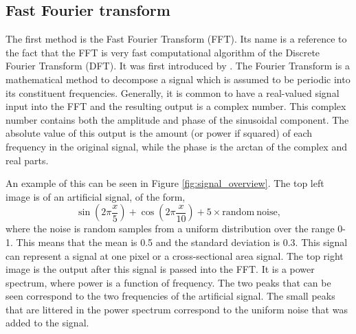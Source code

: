 \subsection{Fast Fourier transform}
\label{FFT}

	The first method is the Fast Fourier Transform (FFT).
	Its name is a reference to the fact that the FFT is very fast computational algorithm of the Discrete Fourier Transform (DFT).
    It was first introduced by \cite{cooley1965algorithm}.
	The Fourier Transform is a mathematical method to decompose a signal which is assumed to be periodic into its constituent frequencies.
	Generally, it is common to have a real-valued signal input into the FFT and the resulting output is a complex number.
	This complex number contains both the amplitude and phase of the sinusoidal component.
	The absolute value of this output is the amount (or power if squared) of each frequency in the original signal, while the phase is the arctan of the complex and real parts. 
	
    An example of this can be seen in Figure \ref{fig:signal_overview}.
    The top left image is of an artificial signal, of the form, $$\sin\left(2\pi \frac{x}{5}\right) + \cos\left(2\pi \frac{x}{10}\right) + 5\times\mathrm{random\ noise},$$ where the noise is random samples from a uniform distribution over the range 0-1.
    This means that the mean is 0.5 and the standard deviation is $0.3$.
    This signal can represent a signal at one pixel or a cross-sectional area signal.
    The top right image is the output after this signal is passed into the FFT.
    It is a power spectrum, where power is a function of frequency.
    The two peaks that can be seen correspond to the two frequencies of the artificial signal.
    The small peaks that are littered in the power spectrum correspond to the uniform noise that was added to the signal.
    
